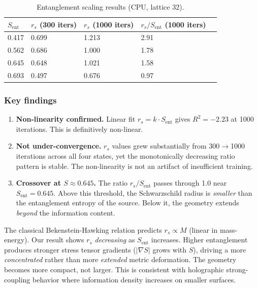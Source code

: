 \documentclass[12pt,a4paper]{article}
\newcommand{\Sent}{S_{\mathrm{ent}}}
\newcommand{\rs}{r_s}
\begin{document}
\begin{table}[h]
\centering
\caption{Entanglement scaling results (CPU, lattice 32).}
\label{tab:scaling}
\begin{tabular}{lllll}
\toprule
$\Sent$ & $\rs$ (300 iters) & $\rs$ (1000 iters) & $\rs/\Sent$ (1000 iters) \\
\midrule
0.417 & 0.699 & 1.213 & 2.91 \\
0.562 & 0.686 & 1.000 & 1.78 \\
0.645 & 0.648 & 1.021 & 1.58 \\
0.693 & 0.497 & 0.676 & 0.97 \\
\bottomrule
\end{tabular}
\end{table}

\subsubsection*{Key findings}

\begin{enumerate}
  \item \textbf{Non-linearity confirmed.}
        Linear fit $\rs = k\cdot\Sent$ gives $R^2=-2.23$ at 1000 iterations.
        This is definitively non-linear.

  \item \textbf{Not under-convergence.}
        $\rs$ values grew substantially from 300$\to$1000 iterations across
        all four states, yet the monotonically decreasing ratio pattern
        is stable. The non-linearity is not an artifact of insufficient
        training.

  \item \textbf{Crossover at $S\approx 0.645$.}
        The ratio $\rs/\Sent$ passes through 1.0 near $\Sent=0.645$.
        Above this threshold, the Schwarzschild radius is \emph{smaller}
        than the entanglement entropy of the source.
        Below it, the geometry extends \emph{beyond} the information content.
\end{enumerate}

The classical Bekenstein-Hawking relation predicts $\rs\propto M$ (linear in
mass-energy). Our result shows $\rs$ \emph{decreasing} as $\Sent$ increases.
Higher entanglement produces stronger stress tensor gradients
($|\nabla S|$ grows with $S$), driving a more \emph{concentrated} rather
than more \emph{extended} metric deformation. The geometry becomes more
compact, not larger. This is consistent with holographic strong-coupling
behavior where information density increases on smaller surfaces.
\end{document}

